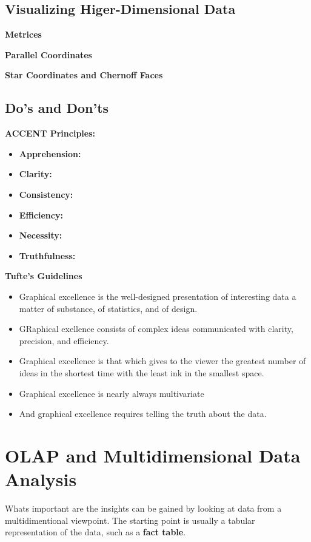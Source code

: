 	\subsection{Visualizing Higer-Dimensional Data}
		{\bf Metrices}

		{\bf Parallel Coordinates}

		{\bf Star Coordinates and Chernoff Faces}

	\subsection{Do's and Don'ts}

		{\bf ACCENT Principles:} 
			\begin{itemize}
				\item {\bf Apprehension:}
				\item {\bf Clarity:}
				\item {\bf Consistency:}
				\item{\bf Efficiency:}
				\item {\bf Necessity:}
				\item {\bf Truthfulness:}
			\end{itemize}

		{\bf Tufte's Guidelines}
			\begin{itemize}
				\item Graphical excellence is the well-designed presentation of
				interesting data a matter of substance, of statistics, and of design.
				\item GRaphical exellence consists of complex ideas communicated 
				with clarity, precision, and efficiency.
				\item Graphical excellence is that which gives to the viewer the greatest
				number of ideas in the shortest time with the least ink in the smallest space.
				\item Graphical excellence is nearly always multivariate
				\item And graphical excellence requires telling the truth about the data.
			\end{itemize}

	\section{OLAP and Multidimensional Data Analysis}

		Whats important are the insights can be gained by looking at data from
		a multidimentional viewpoint.
		The starting point is usually a tabular representation of the data, such 
		as a {\bf fact table}. 

